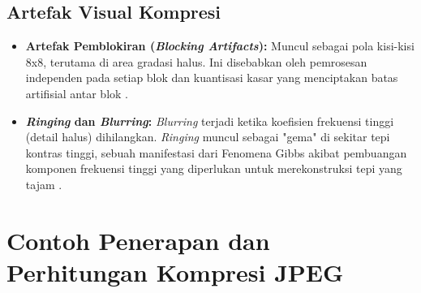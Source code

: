 \documentclass[a4paper]{article}
\begin{document}
\subsection{Artefak Visual Kompresi}
\begin{itemize}
  \item \textbf{Artefak Pemblokiran (\textit{Blocking Artifacts}):} Muncul sebagai pola kisi-kisi 8x8, terutama di area gradasi halus. Ini disebabkan oleh pemrosesan independen pada setiap blok dan kuantisasi kasar yang menciptakan batas artifisial antar blok \cite{singh2012blocking, chou1998smoothing}.
  \item \textbf{\textit{Ringing} dan \textit{Blurring}:} \textit{Blurring} terjadi ketika koefisien frekuensi tinggi (detail halus) dihilangkan. \textit{Ringing} muncul sebagai "gema" di sekitar tepi kontras tinggi, sebuah manifestasi dari Fenomena Gibbs akibat pembuangan komponen frekuensi tinggi yang diperlukan untuk merekonstruksi tepi yang tajam \cite{gottlieb1996gibbs, marziliano2004perceptual}.
\end{itemize}

\begin{table}[h!]
  \centering
  \caption{Perbandingan Kualitas vs. Tingkat Kompresi JPEG}
  \label{tab:kualitas_jpeg}
\end{table}

\section{Contoh Penerapan dan Perhitungan Kompresi JPEG}
\end{document}
